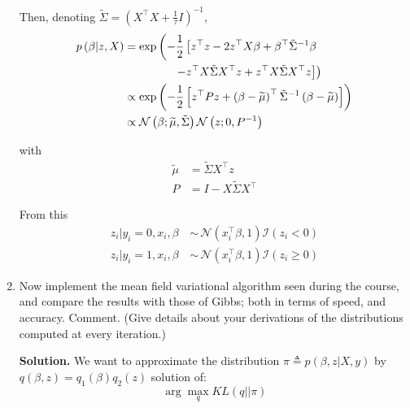 \documentclass[a4paper, 11pt]{article}
\begin{document}
\begin{enumerate}
Then, denoting $\tilde{\Sigma} = \left( X^\top X + \frac{1}{\tau} I \right)^{-1}$,
\begin{equation*}
    \begin{aligned}
    p \left( \beta | z, X \right) &= \exp \left( - \frac{1}{2} \left[ z^\top z - 2 z^\top X \beta + \beta^\top \tilde{\Sigma}^{-1} \beta \right. \right. \\
    &\hspace{1.5cm} \left. \left. - z^\top X \tilde{\Sigma} X^\top z + z^\top X \tilde{\Sigma} X^\top z \right] \right) \\
    &\propto \exp \left( - \frac{1}{2} \left[ z^\top P z + \left( \beta - \widetilde{\mu} \right)^\top \tilde{\Sigma}^{-1} \left( \beta - \widetilde{\mu} \right) \right] \right) \\
    &\propto \mathcal{N} \left( \beta; \widetilde{\mu}, \tilde{\Sigma} \right) \mathcal{N} \left( z; 0, P^{-1} \right)
    \end{aligned}
\end{equation*}

with
\begin{equation*}
    \begin{aligned}
    \widetilde{\mu} &= \tilde{\Sigma} X^\top z \\
    P &= I - X \tilde{\Sigma} X^\top
    \end{aligned}
\end{equation*}

From this 
\begin{equation*}
    \boxed{\begin{aligned}
    z_i | y_i = 0, x_i, \beta \,&\sim\, \mathcal{N} \left( x_{i}^\top \beta, 1 \right) \mathcal{I} \left( z_i < 0 \right) \\
    z_i | y_i = 1, x_i, \beta \,&\sim\, \mathcal{N} \left( x_i^\top \beta, 1 \right) \mathcal{I} \left( z_i \geq 0 \right)
    \end{aligned}}
\end{equation*}
    
    \item Now implement the mean field variational algorithm seen during the course, and compare the results with those of Gibbs; both in terms of speed, and accuracy. Comment. (Give details about your derivations of the distributions computed at every iteration.)
    
    \textbf{Solution.} We want to approximate the distribution $\pi \triangleq p \left( \beta, z |  X, y \right)$ by $q \left( \beta, z \right) = q_1 \left( \beta \right) q_2 \left( z \right)$ solution of:
    \begin{equation*}
        \arg \max_{q} KL \left( q || \pi \right)
    \end{equation*}
    

\end{enumerate}
\end{document}
